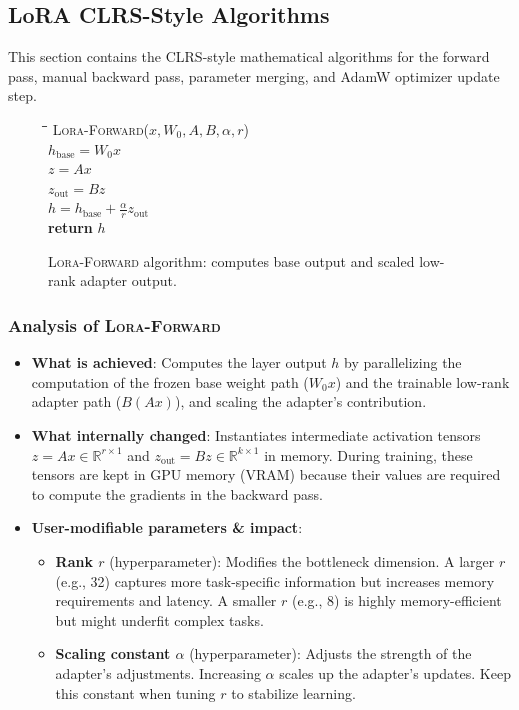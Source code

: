 \subsection{LoRA CLRS-Style Algorithms}
This section contains the CLRS-style mathematical algorithms for the forward pass, manual backward pass, parameter merging, and AdamW optimizer update step.

\begin{figure}[h]
\centering
\begin{minipage}{0.8\linewidth}
\begin{tabbing}
\quad \= \quad \= \quad \= \kill
\textsc{Lora-Forward}($x, W_0, A, B, \alpha, r$) \\
\> $h_{\text{base}} = W_0 x$ \\
\> $z = A x$ \\
\> $z_{\text{out}} = B z$ \\
\> $h = h_{\text{base}} + \frac{\alpha}{r} z_{\text{out}}$ \\
\> \textbf{return} $h$
\end{tabbing}
\end{minipage}
\caption{\textsc{Lora-Forward} algorithm: computes base output and scaled low-rank adapter output.}
\end{figure}

\subsubsection{Analysis of \textsc{Lora-Forward}}
\begin{itemize}
  \item \textbf{What is achieved}: Computes the layer output $h$ by parallelizing the computation of the frozen base weight path ($W_0 x$) and the trainable low-rank adapter path ($B(A x)$), and scaling the adapter's contribution.
  \item \textbf{What internally changed}: Instantiates intermediate activation tensors $z = Ax \in \mathbb{R}^{r \times 1}$ and $z_{\text{out}} = Bz \in \mathbb{R}^{k \times 1}$ in memory. During training, these tensors are kept in GPU memory (VRAM) because their values are required to compute the gradients in the backward pass.
  \item \textbf{User-modifiable parameters \& impact}:
    \begin{itemize}
      \item \textbf{Rank $r$} (hyperparameter): Modifies the bottleneck dimension. A larger $r$ (e.g., 32) captures more task-specific information but increases memory requirements and latency. A smaller $r$ (e.g., 8) is highly memory-efficient but might underfit complex tasks.
      \item \textbf{Scaling constant $\alpha$} (hyperparameter): Adjusts the strength of the adapter's adjustments. Increasing $\alpha$ scales up the adapter's updates. Keep this constant when tuning $r$ to stabilize learning.
    \end{itemize}
\end{itemize}

